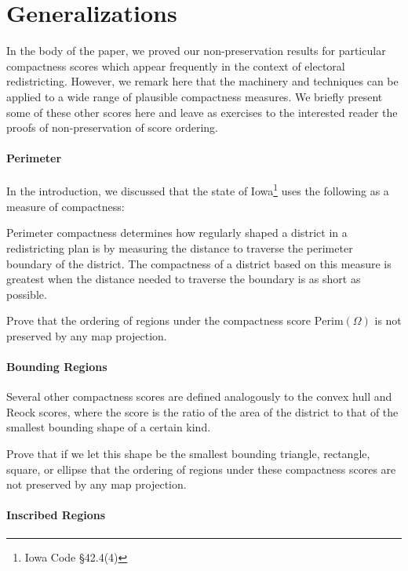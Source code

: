 \section{Generalizations}
\label{sec:generalz}
In the body of the paper, we proved our non-preservation results for particular compactness scores which appear frequently in the context of electoral redistricting.  However, we remark here that the machinery and techniques can be applied to a wide range of plausible compactness measures.  We briefly present some of these other scores here and leave as exercises to the interested reader the proofs of non-preservation of score ordering.

\paragraph{Perimeter} 

In the introduction, we discussed that the state of Iowa\footnote{Iowa Code \S42.4(4)} uses the following as a measure of compactness:

\begin{displayquote}
	
	Perimeter compactness determines how regularly shaped a district in a
	redistricting plan is by measuring the distance to traverse the perimeter boundary of
	the district. The compactness of a district based on this measure is greatest when
	the distance needed to traverse the boundary is as short as possible. 
	
\end{displayquote}

Prove that the ordering of regions  under the compactness score $\mathrm{Perim}(\Omega)$ is not preserved by any map projection.




\paragraph{Bounding Regions}

Several other compactness scores are defined analogously to the convex hull and Reock scores, where the score is the ratio of the area of the district to that of the smallest bounding shape of a certain kind.

Prove that if we let this shape be the smallest bounding triangle, rectangle, square, or ellipse that the ordering of regions under these compactness scores are not preserved by any map projection.

\paragraph{Inscribed Regions}


